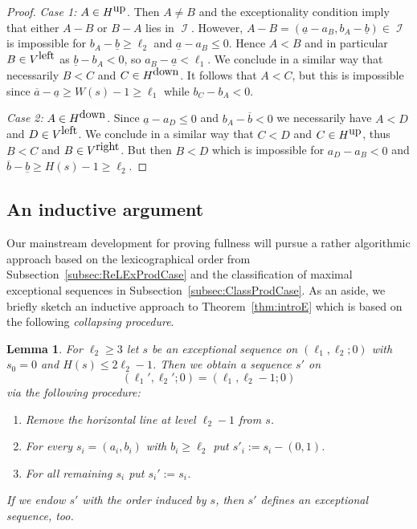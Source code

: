 \documentclass[11pt]{article}
\newtheorem{lemma}[theo]{Lemma}
\theoremstyle{definition}
\numberwithin{equation}{section}
\newcommand{\CI}{{\mathcal I}}
\newcommand{\nImm}{\operatorname{\CI}}
\newcommand{\cl}{s}
\newcommand{\leftR}{V^{\mbox{\rm\tiny left}}}
\newcommand{\rightR}{V^{\mbox{\rm\tiny right}}}
\newcommand{\upperR}{H^{\mbox{\rm\tiny up}}}
\newcommand{\lowerR}{H^{\mbox{\rm\tiny down}}}
\newcommand{\mes}{maximal exceptional sequence}
\newcommand{\ssect}[1]{Subsection~\ref{#1}}
\newcommand{\thFull}{\ref{thm:introE}}
\begin{document}
\begin{proof}
{\em Case 1:} $A\in\upperR$. Then 
$A\not= B$ and the exceptionality 
condition imply that either $A-B$ 
or $B-A$ lies in $\nImm$. However, 
$A-B=(\underline a-a_B,b_A-
\underline b)\in\nImm$ is impossible 
for $b_A-\underline b\geq\ell_2$ and 
$\underline a-a_B\leq0$. Hence $A<B$ 
and in particular $B\in\leftR$ as 
$\underline b-b_A<0$, so 
$a_B-\underline a<\ell_1$. We conclude 
in a similar way that necessarily 
$B<C$ and $C\in\lowerR$. It follows 
that $A<C$, but this is impossible 
since 
$\overline a-\underline a\geq W(\cl)-1\geq\ell_1$ 
while $b_C-b_A<0$.

{\em Case 2:} $A\in\lowerR$. Since 
$\underline a-a_D\leq0$ and 
$b_A-\overline b<0$ we necessarily 
have $A<D$ and $D\in\leftR$. We 
conclude in a similar way that $C<D$ 
and $C\in\upperR$, thus $B<C$ and 
$B\in\rightR$. But then $B<D$ which 
is impossible for $a_D-a_B<0$ and 
$\overline b-\underline b\geq 
H(\cl)-1\geq\ell_2$.
\end{proof}

\subsection{An inductive argument}
\label{subsec:indArg}
Our mainstream development for proving fullness
will pursue a rather algorithmic approach based 
on the lexicographical order from \ssect{subsec:ReLExProdCase} 
and the classification of {\mes}s in \ssect{subsec:ClassProdCase}. 
As an aside, we briefly sketch an inductive approach to 
Theorem~{\thFull} which is based {on the following}
{\em collapsing procedure}.

\begin{lemma}
\label{lem:ProductColl}
For $\ell_2\geq3$ let $\cl$ be an exceptional 
sequence on $(\ell_1,\ell_2;0)$ with $\cl_0=0$
and $H(\cl)\leq2\ell_2-1$. Then we obtain a 
sequence $\cl'$ on 
$$
(\ell_1',\ell_2';0)=(\ell_1,\ell_2-1;0)
$$ 
via the following procedure:
\begin{enumerate}
\item[(i)] 
Remove the horizontal line at level $\ell_2-1$ 
from $\cl$.
\vspace{1ex}
\item[(ii)] 
For every $\cl_i=(a_i,b_i)$ with $b_i\geq\ell_2$
put $\cl'_i:=\cl_i-(0,1)$.
\vspace{1ex}
\item[(iii)] 
For all remaining $\cl_i$ put $\cl_i':=\cl_i$.
\end{enumerate}
If we endow $\cl'$ with the order induced by $\cl$,
then $\cl'$ defines an exceptional sequence, too. 
\end{lemma}
\end{document}
